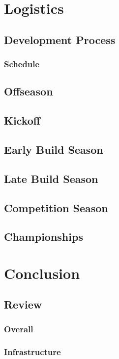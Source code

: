 \documentclass[11pt]{report}
\begin{document}
\chapter{Logistics}

\section{Development Process}
\subsection{Schedule}

\section{Offseason}
\section{Kickoff}
\section{Early Build Season}
\section{Late Build Season}
\section{Competition Season}
\section{Championships}

\chapter{Conclusion}

\section{Review}
\subsection{Overall}
\subsection{Infrastructure}


\printbibliography[heading=bibintoc]
\end{document}
